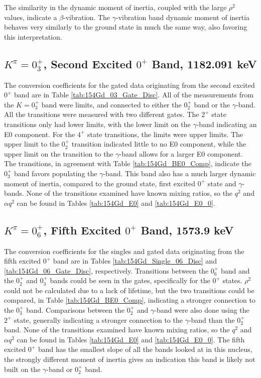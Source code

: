 



The similarity in the dynamic moment of inertia, coupled with the large $\rho^2$ values, indicate a $\beta$-vibration. The $\gamma$-vibration band dynamic moment of inertia behaves very similarly to the ground state in much the same way, also favoring this interpretation. 

\subsection{$K^{\pi}=0^+_3$, Second Excited $0^+$ Band, 1182.091 keV}

The conversion coefficients for the gated data originating from the second excited $0^+$ band are in Table \ref{tab:154Gd_03_Gate_Disc}. All of the measurements from the $K=0^+_3$ band were limits, and connected to either the $0^+_2$ band or the $\gamma$-band. All the transitions were measured with two different gates. The $2^+$ state transitions only had lower limits, with the lower limit on the $\gamma$-band indicating an E0 component. For the $4^+$ state transitions, the limits were upper limits. The upper limit to the $0^+_2$ transition indicated little to no E0 component, while the upper limit on the transition to the $\gamma$-band allows for a larger E0 component. The transitions, in agreement with Table \ref{tab:154Gd_BE0_Comp}, indicate the $0^+_3$ band favors populating the $\gamma$-band. This band also has a much larger dynamic moment of inertia, compared to the ground state, first excited $0^+$ state and $\gamma$-bands. None of the transitions examined have known mixing ratios, so the $q^2$ and $\alpha q^2$ can be found in Tables \ref{tab:154Gd_E0} and \ref{tab:154Gd_E0_0}. 



\subsection{$K^{\pi}=0^+_6$, Fifth Excited $0^+$ Band, 1573.9 keV}

The conversion coefficients for the singles and gated data originating from the fifth excited $0^+$ band are in Tables \ref{tab:154Gd_Single_06_Disc} and \ref{tab:154Gd_06_Gate_Disc}, respectively. Transitions between the $0^+_6$ band and the $0^+_2$ and $0^+_3$ bands could be seen in the gates, specifically for the $0^+$ states. $\rho^2$ could not be calculated due to a lack of lifetime, but the two transitions could be compared, in Table \ref{tab:154Gd_BE0_Comp}, indicating a stronger connection to the $0^+_3$ band. Comparisons between the $0^+_2$ and $\gamma$-band were also done using the $2^+$ state, generally indicating a stronger connection to the $\gamma$-band than the $0^+_2$ band. None of the transitions examined have known mixing ratios, so the $q^2$ and $\alpha q^2$ can be found in Tables \ref{tab:154Gd_E0} and \ref{tab:154Gd_E0_0}. The fifth excited $0^+$ band has the smallest slope of all the bands looked at in this nucleus, the strongly different moment of inertia gives an indication this band is likely not built on the $\gamma$-band or $0^+_2$ band.


